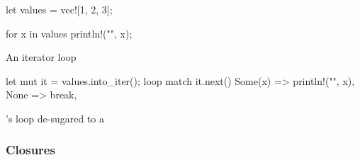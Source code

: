\begin{listing}[!h]
\begin{minipage}{0.4\textwidth}
  \begin{listing}[H]
    \begin{rustcode}
let values = vec![1, 2, 3];

for x in values {
  println!("{}", x);
}
    \end{rustcode}
    \caption{An iterator  loop}
    \label{lst:rust:for}
  \end{listing}
\end{minipage}
\hfill
\begin{minipage}{0.5\textwidth}
  \begin{listing}[H]
    \begin{rustcode}
let mut it = values.into_iter();
loop {
  match it.next() {
    Some(x) => println!("{}", x),
    None => break,
  }
}
    \end{rustcode}
    \caption{{\rust}'s  loop de-sugared to a }
    \label{lst:rust:desugared-for}
  \end{listing}
\end{minipage}
\end{listing}




\subsubsection{Closures}
\label{sec:back:rust:closures}


